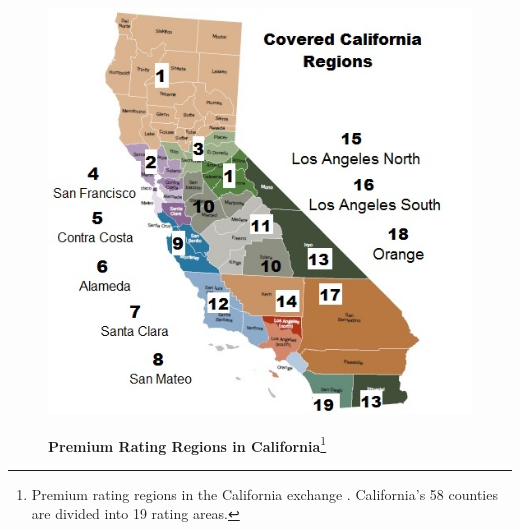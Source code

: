 \documentclass[12pt]{article}
\begin{document}
\clearpage
\newpage
\begin{figure}[htb]
\centering
\footnotesize
\begin{minipage}[h]{6in}
\caption[caption]{\textbf{Premium Rating Regions in California}\footnote{Premium rating regions in the California exchange \citep{CARATE2016}. California's 58 counties are divided into 19 rating areas.}}
\centerline{%
    \includegraphics[scale=.45]{finals/pics/CA_Rating_Regions2.jpg}	
}
\label{rating_area_partitions}
\end{minipage}
\end{figure}  
\end{document}
